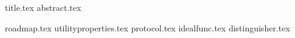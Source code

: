 \documentclass[11pt]{llncs}
\begin{document}
{title.tex}
\thispagestyle{plain}
{abstract.tex}

{roadmap.tex}
{utilityproperties.tex}
{protocol.tex}
{idealfunc.tex}
{distinguisher.tex}

\end{document}
